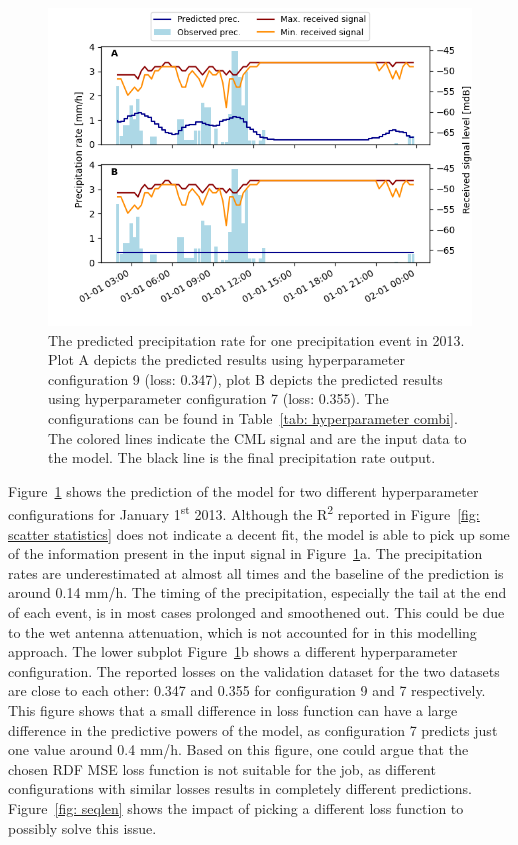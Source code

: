 \documentclass[twocolumn, 10pt, a4paper]{memoir}
\begin{document}
	
	\begin{figure}[H]
		\includegraphics[width=\columnwidth]{CML_timesignal_faulty}
		\caption{The predicted precipitation rate for one precipitation event in 2013. Plot A depicts the predicted results using hyperparameter configuration 9 (loss: 0.347), plot B depicts the predicted results using hyperparameter configuration 7 (loss: 0.355). The configurations can be found in Table~\ref{tab: hyperparameter combi}. The colored lines indicate the CML signal and are the input data to the model. The black line is the final precipitation rate output.}
		\label{fig: CML timesignal}
	\end{figure}
	Figure~\ref{fig: CML timesignal} shows the prediction of the model for two different hyperparameter configurations for January 1\textsuperscript{st} 2013. Although the R\textsuperscript{2} reported in Figure~\ref{fig: scatter statistics} does not indicate a decent fit, the model is able to pick up some of the information present in the input signal in Figure~\ref{fig: CML timesignal}a. The precipitation rates are underestimated at almost all times and the baseline of the prediction is around 0.14 mm/h. The timing of the precipitation, especially the tail at the end of each event, is in most cases prolonged and smoothened out. This could be due to the wet antenna attenuation, which is not accounted for in this modelling approach. The lower subplot Figure~\ref{fig: CML timesignal}b shows a different hyperparameter configuration. The reported losses on the validation dataset for the two datasets are close to each other: 0.347 and 0.355 for configuration 9 and 7 respectively. This figure shows that a small difference in loss function can have a large difference in the predictive powers of the model, as configuration 7 predicts just one value around 0.4 mm/h. Based on this figure, one could argue that the chosen RDF MSE loss function is not suitable for the job, as different configurations with similar losses results in completely different predictions. Figure~\ref{fig: seqlen} shows the impact of picking a different loss function to possibly solve this issue.
			
\end{document}
